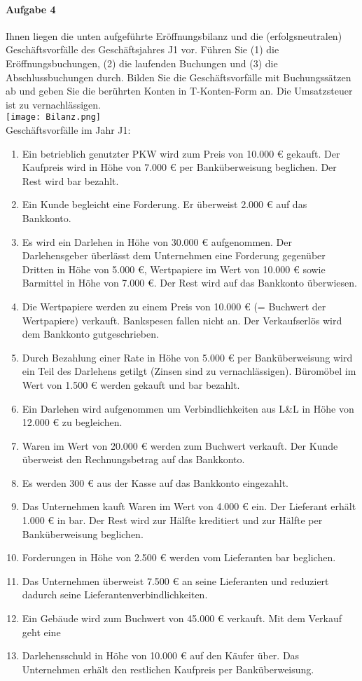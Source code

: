 \documentclass[paper=a4, fontsize=11pt]{scrartcl}
\numberwithin{equation}{section}
\numberwithin{figure}{section}
\numberwithin{table}{section}
\begin{document}
\paragraph{Aufgabe 4}
Ihnen liegen die unten aufgeführte Eröffnungsbilanz und die (erfolgsneutralen) Geschäftsvorfälle des Geschäftsjahres J1 vor. Führen Sie (1) die Eröffnungsbuchungen, (2) die laufenden Buchungen und (3) die Abschlussbuchungen durch. Bilden Sie die Geschäftsvorfälle mit Buchungssätzen ab und geben Sie die berührten Konten in T-Konten-Form an. Die Umsatzsteuer ist zu vernachlässigen. \\
\texttt{[image: Bilanz.png]} \\
Geschäftsvorfälle im Jahr J1: \\
\begin{enumerate}
\item Ein betrieblich genutzter PKW wird zum Preis von 10.000 € gekauft. Der Kaufpreis
wird in Höhe von 7.000 € per Banküberweisung beglichen. Der Rest wird bar bezahlt.
\item Ein Kunde begleicht eine Forderung. Er überweist 2.000 € auf das Bankkonto.
\item Es wird ein Darlehen in Höhe von 30.000 € aufgenommen. Der Darlehensgeber überlässt dem Unternehmen eine Forderung gegenüber Dritten in Höhe von 5.000 €, Wertpapiere im Wert von 10.000 € sowie Barmittel in Höhe von 7.000 €. Der Rest wird auf
das Bankkonto überwiesen.
\item Die Wertpapiere werden zu einem Preis von 10.000 € (= Buchwert der Wertpapiere)
verkauft. Bankspesen fallen nicht an. Der Verkaufserlös wird dem Bankkonto gutgeschrieben.
\item Durch Bezahlung einer Rate in Höhe von 5.000 € per Banküberweisung wird ein Teil
des Darlehens getilgt (Zinsen sind zu vernachlässigen).
Büromöbel im Wert von 1.500 € werden gekauft und bar bezahlt.
\item Ein Darlehen wird aufgenommen um Verbindlichkeiten aus L\&L in Höhe von 12.000
€ zu begleichen.
\item Waren im Wert von 20.000 € werden zum Buchwert verkauft. Der Kunde überweist
den Rechnungsbetrag auf das Bankkonto.
\item Es werden 300 € aus der Kasse auf das Bankkonto eingezahlt.
\item Das Unternehmen kauft Waren im Wert von 4.000 € ein. Der Lieferant erhält 1.000 €
in bar. Der Rest wird zur Hälfte kreditiert und zur Hälfte per Banküberweisung beglichen.
\item Forderungen in Höhe von 2.500 € werden vom Lieferanten bar beglichen.
\item Das Unternehmen überweist 7.500 € an seine Lieferanten und reduziert dadurch seine Lieferantenverbindlichkeiten.
\item Ein Gebäude wird zum Buchwert von 45.000 € verkauft. Mit dem Verkauf geht eine
\item Darlehensschuld in Höhe von 10.000 € auf den Käufer über. Das Unternehmen erhält
den restlichen Kaufpreis per Banküberweisung.
\end{enumerate}
\end{document}

